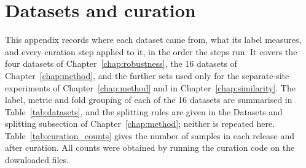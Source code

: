\chapter{Datasets and curation}\label{app:datasets}


This appendix records where each dataset came from, what its label measures, and every curation step applied to it, in the order the steps run. It covers the four datasets of Chapter~\ref{chap:robustness}, the 16 datasets of Chapter~\ref{chap:method}, and the further sets used only for the separate-site experiments of Chapter~\ref{chap:method} and in Chapter~\ref{chap:similarity}. The label, metric and fold grouping of each of the 16 datasets are summarised in Table~\ref{tab:datasets}, and the splitting rules are given in the Datasets and splitting subsection of Chapter~\ref{chap:method}; neither is repeated here. Table~\ref{tab:curation_counts} gives the number of samples in each release and after curation. All counts were obtained by running the curation code on the downloaded files.

